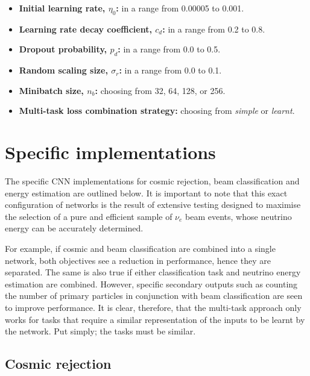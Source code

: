 \begin{itemize}
    \item \textbf{Initial learning rate, $\eta_{0}$:} in a range from 0.00005 to 0.001.
    \item \textbf{Learning rate decay coefficient, $c_{d}$:} in a range from 0.2 to 0.8.
    \item \textbf{Dropout probability, $p_{d}$:} in a range from 0.0 to 0.5.
    \item \textbf{Random scaling size, $\sigma_{r}$:} in a range from 0.0 to 0.1.
    \item \textbf{Minibatch size, $n_{b}$:} choosing from 32, 64, 128, or 256.
    \item \textbf{Multi-task loss combination strategy:} choosing from \emph{simple} or
          \emph{learnt}.
\end{itemize}

\section{Specific implementations} %
\label{sec:cvn_specific} %

The specific CNN implementations for cosmic rejection, beam classification and energy estimation
are outlined below. It is important to note that this exact configuration of networks is the
result of extensive testing designed to maximise the selection of a pure and efficient sample of
$\nu_{e}$ beam events, whose neutrino energy can be accurately determined.

For example, if cosmic and beam classification are combined into a single network, both objectives
see a reduction in performance, hence they are separated. The same is also true if either
classification task and neutrino energy estimation are combined. However, specific secondary
outputs such as counting the number of primary particles in conjunction with beam classification
are seen to improve performance. It is clear, therefore, that the multi-task approach only works
for tasks that require a similar representation of the inputs to be learnt by the network. Put
simply; the tasks must be similar.

\subsection{Cosmic rejection} %
\label{sec:cvn_specific_cosmic} %

